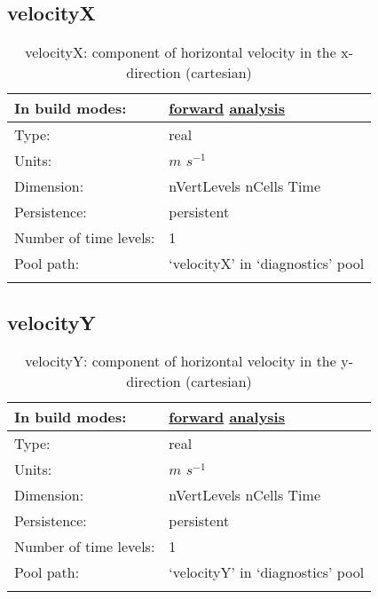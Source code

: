 \subsection[velocityX]{velocityX}
\label{subsec:var_sec_diagnostics_velocityX}
\begin{center}
\begin{longtable}{| p{2.0in} | p{4.0in} |}
        \hline 
        In build modes: & \hyperref[subsec:forward_var_tab_diagnostics]{forward} \hyperref[subsec:analysis_var_tab_diagnostics]{analysis} \\
        \hline 
        Type: & real \\
        \hline 
        Units: & $m$ $s^{-1}$ \\
        \hline 
        Dimension: & nVertLevels nCells Time \\
        \hline 
        Persistence: & persistent \\
        \hline 
        Number of time levels: & 1 \\
        \hline 
            Pool path: & `velocityX' in `diagnostics' pool \\
		 \hline 
    \caption{velocityX: component of horizontal velocity in the x-direction (cartesian)}
\end{longtable}
\end{center}
\subsection[velocityY]{velocityY}
\label{subsec:var_sec_diagnostics_velocityY}
\begin{center}
\begin{longtable}{| p{2.0in} | p{4.0in} |}
        \hline 
        In build modes: & \hyperref[subsec:forward_var_tab_diagnostics]{forward} \hyperref[subsec:analysis_var_tab_diagnostics]{analysis} \\
        \hline 
        Type: & real \\
        \hline 
        Units: & $m$ $s^{-1}$ \\
        \hline 
        Dimension: & nVertLevels nCells Time \\
        \hline 
        Persistence: & persistent \\
        \hline 
        Number of time levels: & 1 \\
        \hline 
            Pool path: & `velocityY' in `diagnostics' pool \\
		 \hline 
    \caption{velocityY: component of horizontal velocity in the y-direction (cartesian)}
\end{longtable}
\end{center}
